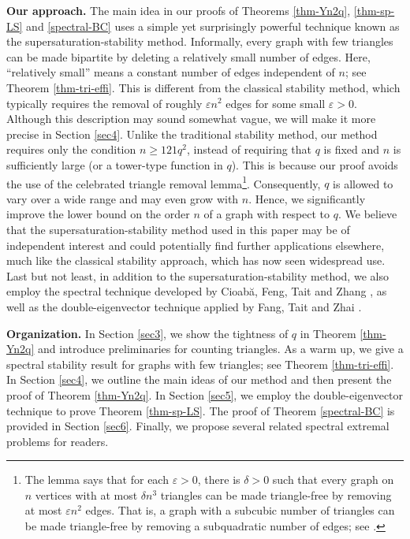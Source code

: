 \documentclass[11pt]{article}
\begin{document}
{\bf Our approach.} 
The main idea in our proofs of Theorems \ref{thm-Yn2q}, \ref{thm-sp-LS} and \ref{spectral-BC} 
uses a simple yet surprisingly powerful technique known as 
the supersaturation-stability method.  
Informally, every graph with few triangles can be made bipartite by deleting a relatively small number of edges.   
Here, ``relatively small'' means a constant number of edges independent of $n$; see Theorem \ref{thm-tri-effi}.
This is different from the classical stability method, 
which typically requires the removal of roughly $\varepsilon n^2$ edges for some small $\varepsilon >0$. 
Although this description may sound somewhat vague, we will make it more precise in Section \ref{sec4}. 
Unlike the traditional stability method, 
our method requires only the condition $n \ge 121q^2$, instead of requiring that $q$ is fixed and $n$ is sufficiently large (or a tower-type function in $q$). 
This is because our proof avoids the use of the celebrated triangle removal lemma\footnote{The lemma says that for each $\varepsilon >0$,  there is $\delta >0$ such that every graph on $n$ vertices with at most $\delta n^3$ triangles can be made triangle-free by removing at most $\varepsilon n^2$ edges.  That is, a graph with a subcubic number of triangles can be made triangle-free by removing a subquadratic number of edges; see \cite{CF2013}.}. 
Consequently, $q$ is allowed to vary over a wide range and may even grow with $n$. 
Hence, we significantly improve the lower bound 
on the order $n$ of a graph with respect to $q$. 
We believe that the supersaturation-stability method used in this paper may be of independent interest and could potentially find further applications elsewhere, much like the classical stability approach, which has now seen widespread use. 
Last but not least, in addition to the supersaturation-stability method, we also employ the spectral technique developed by Cioab\u{a}, Feng, Tait and Zhang \cite{CFTZ20},  
 as well as the double-eigenvector technique 
 applied by Fang, Tait and Zhai \cite{FTZ2024}. 
 
 
\medskip
\noindent 
{\bf Organization.}   
 In Section \ref{sec3}, we show the tightness of $q$ in Theorem \ref{thm-Yn2q} and introduce preliminaries for counting  triangles. 
As a warm up, we give a spectral stability result  
 for graphs with few triangles; 
 see Theorem \ref{thm-tri-effi}. 
 In Section \ref{sec4}, 
we outline the main ideas of our method and 
then present the proof of 
Theorem \ref{thm-Yn2q}. 
In Section \ref{sec5}, we employ the double-eigenvector technique to prove Theorem \ref{thm-sp-LS}. 
The proof of Theorem \ref{spectral-BC} is provided  
in Section \ref{sec6}.   
Finally, 
we propose several related spectral extremal problems  for  readers. 
\end{document}
